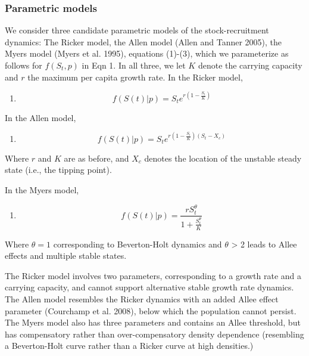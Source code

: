 \documentclass[author-year, 12pt,review]{elsarticle} %
\begin{document}
\subsubsection{Parametric models}\label{parametric-models}

We consider three candidate parametric models of the stock-recruitment
dynamics: The Ricker model, the Allen model (Allen and Tanner 2005), the
Myers model (Myers et al. 1995), equations (1)-(3), which we
parameterize as follows for $f(S_t,p)$ in Eqn 1. In all three, we let
$K$ denote the carrying capacity and $r$ the maximum per capita growth
rate. In the Ricker model,

\begin{enumerate}
\def\labelenumi{(\arabic{enumi})}
\itemsep1pt\parskip0pt
\item
  \[ f(S(t)|p) = S_t e^{r \left(1 - \frac{S_t}{K} \right) } \]
\end{enumerate}

In the Allen model,

\begin{enumerate}
\def\labelenumi{(\arabic{enumi})}
\setcounter{enumi}{1}
\itemsep1pt\parskip0pt
\item
  \[ f(S(t)|p) = S_t e^{r \left(1 - \frac{S_t}{K}\right)\left(S_t - X_c\right)} \]
\end{enumerate}

Where $r$ and $K$ are as before, and $X_c$ denotes the location of the
unstable steady state (i.e., the tipping point).

In the Myers model,

\begin{enumerate}
\def\labelenumi{(\arabic{enumi})}
\setcounter{enumi}{2}
\itemsep1pt\parskip0pt
\item
  \[ f(S(t) | p)  = \frac{r S_t^{\theta}}{1 + \frac{S_t^\theta}{K}}\]
\end{enumerate}

Where $\theta = 1$ corresponding to Beverton-Holt dynamics and $\theta$
\textgreater{} 2 leads to Allee effects and multiple stable states.

The Ricker model involves two parameters, corresponding to a growth rate
and a carrying capacity, and cannot support alternative stable growth
rate dynamics. The Allen model resembles the Ricker dynamics with an
added Allee effect parameter (Courchamp et al. 2008), below which the
population cannot persist. The Myers model also has three parameters and
contains an Allee threshold, but has compensatory rather than
over-compensatory density dependence (resembling a Beverton-Holt curve
rather than a Ricker curve at high densities.)
\end{document}
